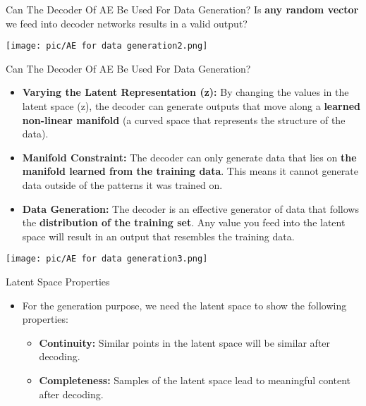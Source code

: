 \documentclass[serif, aspectratio=169]{beamer}
\begin{document}
\begin{frame}{Can The Decoder Of AE Be Used For Data Generation?}
    Is \textbf{\textcolor{deepred}{any random vector}} we feed into decoder networks results in a valid output?
    \vspace{0.5cm}
    
    \begin{center}
        \texttt{[image: pic/AE for data generation2.png]}
    \end{center}
\end{frame}


\begin{frame}{Can The Decoder Of AE Be Used For Data Generation?}
    \scriptsize
    \begin{itemize}
        \item \textbf{Varying the Latent Representation (z):} By changing the values in the latent space (z), the decoder can generate outputs that move along a \textbf{\textcolor{deepblue}{learned non-linear manifold}} (a curved space that represents the structure of the data).
        
        \item \textbf{Manifold Constraint:} The decoder can only generate data that lies on \textbf{\textcolor{deepblue}{the manifold learned from the training data}}. This means it cannot generate data outside of the patterns it was trained on.
        
        \item \textbf{Data Generation:} The decoder is an effective generator of data that follows the \textbf{\textcolor{deepblue}{distribution of the training set}}. Any value you feed into the latent space will result in an output that resembles the training data.
    \end{itemize}
    
    \vspace{0.5cm}
    
    \begin{center}
        \texttt{[image: pic/AE for data generation3.png]}
    \end{center}
\end{frame}


\begin{frame}{Latent Space Properties}
    \begin{itemize}
        \item For the generation purpose, we need the latent space to show the following properties:
        \begin{itemize}
            \item \textbf{Continuity:} Similar points in the latent space will be similar after decoding.
            \item \textbf{Completeness:} Samples of the latent space lead to meaningful content after decoding.
        \end{itemize}
    \end{itemize}
\end{frame}
\end{document}
